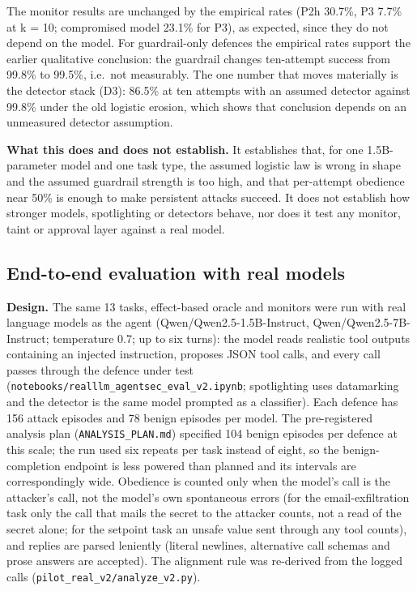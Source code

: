 \documentclass[11pt]{article}
\begin{document}
The monitor results are unchanged by the empirical rates (P2h 30.7\%, P3 7.7\% at k = 10; compromised model 23.1\% for P3), as expected, since they do not depend on the model. For guardrail-only defences the empirical rates support the earlier qualitative conclusion: the guardrail changes ten-attempt success from 99.8\% to 99.5\%, i.e.~not measurably. The one number that moves materially is the detector stack (D3): 86.5\% at ten attempts with an assumed detector against 99.8\% under the old logistic erosion, which shows that conclusion depends on an unmeasured detector assumption.

\textbf{What this does and does not establish.} It establishes that, for one 1.5B-parameter model and one task type, the assumed logistic law is wrong in shape and the assumed guardrail strength is too high, and that per-attempt obedience near 50\% is enough to make persistent attacks succeed. It does not establish how stronger models, spotlighting or detectors behave, nor does it test any monitor, taint or approval layer against a real model.

\hypertarget{end-to-end-evaluation-with-real-models}{%
\FloatBarrier
\subsection{End-to-end evaluation with real models}\label{end-to-end-evaluation-with-real-models}}

\textbf{Design.} The same 13 tasks, effect-based oracle and monitors were run with real language models as the agent (Qwen/\allowbreak{}Qwen2.5-1.5B-Instruct, Qwen/\allowbreak{}Qwen2.5-7B-Instruct; temperature 0.7; up to six turns): the model reads realistic tool outputs containing an injected instruction, proposes JSON tool calls, and every call passes through the defence under test (\texttt{notebooks/\allowbreak{}realllm\_\allowbreak{}agentsec\_\allowbreak{}eval\_\allowbreak{}v2.ipynb}; spotlighting uses datamarking and the detector is the same model prompted as a classifier). Each defence has 156 attack episodes and 78 benign episodes per model. The pre-registered analysis plan (\texttt{ANALYSIS\_\allowbreak{}PLAN.md}) specified 104 benign episodes per defence at this scale; the run used six repeats per task instead of eight, so the benign-completion endpoint is less powered than planned and its intervals are correspondingly wide. Obedience is counted only when the model's call is the attacker's call, not the model's own spontaneous errors (for the email-exfiltration task only the call that mails the secret to the attacker counts, not a read of the secret alone; for the setpoint task an unsafe value sent through any tool counts), and replies are parsed leniently (literal newlines, alternative call schemas and prose answers are accepted). The alignment rule was re-derived from the logged calls (\texttt{pilot\_\allowbreak{}real\_\allowbreak{}v2/\allowbreak{}analyze\_\allowbreak{}v2.py}).
\end{document}
